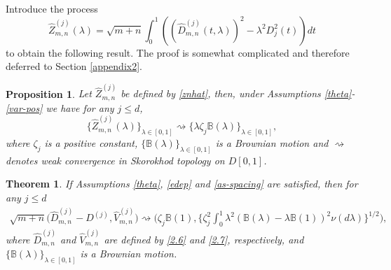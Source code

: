 \documentclass[11pt]{article}
\newtheorem{theorem}{Theorem}[section]
\newtheorem{proposition}{Proposition}[section]
\numberwithin{equation}{section}
\numberwithin{theorem}{section}
\numberwithin{lemma}{section}
\numberwithin{proposition}{section}
\numberwithin{cor}{section}
\numberwithin{definition}{section}
\numberwithin{cons}{section}
\numberwithin{rem}{section}
\numberwithin{exa}{section}
\numberwithin{table}{section}
\numberwithin{figure}{section}
\numberwithin{algo}{section}
\begin{document}
{{Introduce the process
\begin{equation} \label{znhat}
 \hat Z^{(j)}_{m,n} (\lambda) = \sqrt{m+n} \int^1_0 ( (\hat D^{(j)}_{m,n} (t,\lambda))^2 - \lambda^2 D^2_j(t))dt
 \end{equation}
 to obtain the  following result. The proof is somewhat complicated and therefore deferred to  Section  \ref{appendix2}.


\begin{proposition} \label{prop1}
 Let    $\hat Z^{(j)}_{m,n} $ be defined by  \eqref{znhat}, then,  under  Assumptions  \ref{theta}-\ref{var-pos} we have for any   $j \le d$,
  $$
  \{ \hat Z^{(j)}_{m,n} (\lambda) \}_{\lambda \in [0,1]} \rightsquigarrow \{ \lambda \zeta_j \mathbb{B} (\lambda) \}_{\lambda \in [0,1]},
  $$
  where $\zeta_j$ is a positive constant,  $\{ \mathbb{B}(\lambda)\}_{\lambda \in [0,1]}$ is a Brownian motion and $\rightsquigarrow$ denotes weak convergence in Skorokhod topology on $D[0,1]$.
\end{proposition}



\begin{theorem}\label{thm2.1}
If Assumptions \ref{theta},  \ref{edep}   and \ref{as-spacing} are satisfied, then for any  $j\leq d$
  \begin{eqnarray}
    \nonumber
\sqrt{m+n}  \big ( {\hat D^{(j)}_{m,n} - D^{(j)}},  {\hat V^{(j)}_{m,n}}  \big )
      \rightsquigarrow  \Big ( \zeta_j \mathbb{B}(1) , {  \Big \{ \zeta_j^2 \int^1_0 \lambda^2 (\mathbb{B}(\lambda) - \lambda \mathbb{B}(1))^{2} \nu (d \lambda ) \Big  \}^{1/2}} \Big ),
  \end{eqnarray}
  where $\hat D^{(j)}_{m,n}$ and $ \hat V^{(j)}_{m,n} $ are defined by  \eqref{2.6} and \eqref{2.7}, respectively, and
  $\{ \mathbb{B}(\lambda)\}_{\lambda \in [0,1]}$ is a Brownian motion.
\end{theorem}

}}
\end{document}
